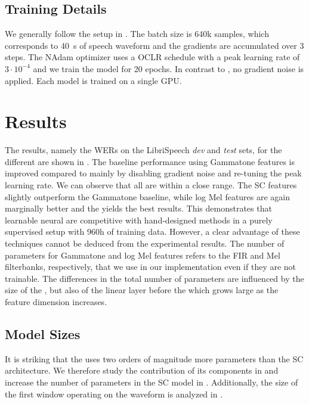 \documentclass{INTERSPEECH2023}
\begin{document}
\subsection{Training Details}
We generally follow the setup in \cite{zhou2022efficient}.
The batch size is 640k samples, which corresponds to \SI{40}{\second} of speech waveform and the gradients are accumulated over 3 steps.
The NAdam optimizer uses a \gls{OCLR} schedule with a peak learning rate of $3\cdot 10^{-4}$ and we train the model for 20 epochs.
In contrast to \cite{zhou2022efficient}, no gradient noise is applied.
Each model is trained on a single \gls{GPU}.

\section{Results}
The results, namely the \glspl{WER} on the LibriSpeech \textit{dev} and \textit{test} sets, for the different \fes are shown in .
The baseline performance using Gammatone features is improved compared to \cite{zhou2022efficient} mainly by disabling gradient noise and re-tuning the peak learning rate.
We can observe that all \fes are within a close range.
The \gls{SC} features slightly outperform the Gammatone baseline, while log Mel features are again marginally better and the \wvtwo \fe yields the best results.
This demonstrates that learnable neural \fes are competitive with hand-designed methods in a purely supervised setup with 960h of training data.
However, a clear advantage of these techniques cannot be deduced from the experimental results.
The number of parameters for Gammatone and log Mel features refers to the \gls{FIR} and Mel filterbanks, respectively, that we use in our implementation even if they are not trainable.
The differences in the total number of parameters are influenced by the size of the \fe, but also of the linear layer before the \conformer which grows large as the feature dimension increases.


\subsection{Model Sizes}
It is striking that the \wvtwo \fe uses two orders of magnitude more parameters than the \gls{SC} architecture.
We therefore study the contribution of its components in  and increase the number of parameters in the \gls{SC} model in .
Additionally, the size of the first window operating on the waveform is analyzed in .
\end{document}
